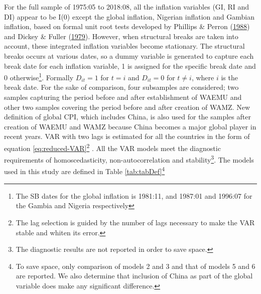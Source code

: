 \documentclass[]{article}
\let\rmarkdownfootnote\footnote%
\def\footnote{\protect\rmarkdownfootnote}
\begin{document}
For the full sample of 1975:05 to 2018:08, all the inflation variables (GI, RI and DI) appear to be I(0) except the global inflation, Nigerian inflation and Gambian inflation, based on formal unit root tests developed by Phillips \& Perron (\protect\hyperlink{ref-10.2307ux2f2336182}{1988}) and Dickey \& Fuller (\protect\hyperlink{ref-Dickey1979}{1979}). However, when structural breaks are taken into account, these integrated inflation variables become stationary. The structural breaks occurs at various dates, so a dummy variable is generated to capture each break date for each inflation variable, 1 is assigned for the specific break date and 0 otherwise\footnote{The SB dates for the global inflation is 1981:11, and 1987:01 and 1996:07 for the Gambia and Nigeria respectively}. Formally \(D_{it}=1\) for \(t=i\) and \(D_{it}=0\) for \(t\neq i\), where \(i\) is the break date. For the sake of comparison, four subsamples are considered; two samples capturing the period before and after establishment of WAEMU and other two samples covering the period before and after creation of WAMZ. New definition of global CPI, which includes China, is also used for the samples after creation of WAEMU and WAMZ because China becomes a major global player in recent years. VAR with two lags is estimated for all the countries in the form of equation \eqref{eq:reduced-VAR}\footnote{The lag selection is guided by the number of lags necessary to make the VAR stable and whiten its error.} . All the VAR models meet the diagnostic requirements of homoscedasticity, non-autocorrelation and stability\footnote{The diagnostic results are not reported in order to save space.}. The models used in this study are defined in Table \ref{tab:tabDef}\footnote{To save space, only comparison of models 2 and 3 and that of models 5 and 6 are reported. We also determine that inclusion of China as part of the global variable does make any significant difference.}
\end{document}
